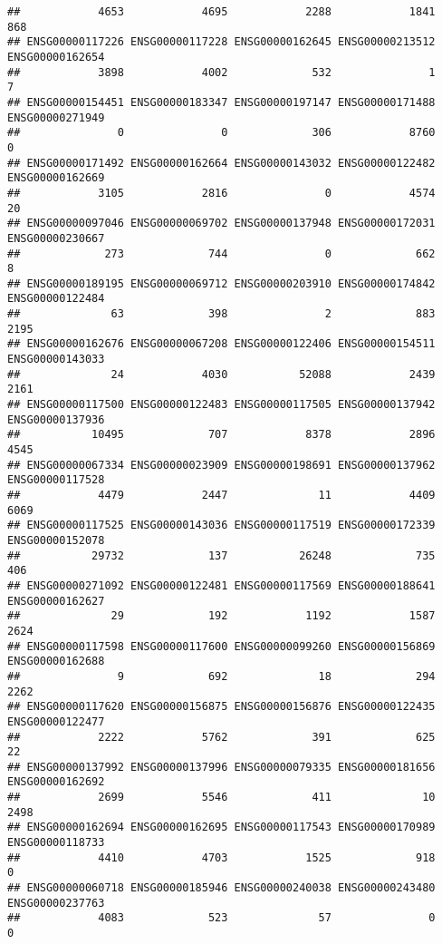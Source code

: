\documentclass[
]{article}
\begin{document}
\begin{verbatim}
##            4653            4695            2288            1841             868 
## ENSG00000117226 ENSG00000117228 ENSG00000162645 ENSG00000213512 ENSG00000162654 
##            3898            4002             532               1               7 
## ENSG00000154451 ENSG00000183347 ENSG00000197147 ENSG00000171488 ENSG00000271949 
##               0               0             306            8760               0 
## ENSG00000171492 ENSG00000162664 ENSG00000143032 ENSG00000122482 ENSG00000162669 
##            3105            2816               0            4574              20 
## ENSG00000097046 ENSG00000069702 ENSG00000137948 ENSG00000172031 ENSG00000230667 
##             273             744               0             662               8 
## ENSG00000189195 ENSG00000069712 ENSG00000203910 ENSG00000174842 ENSG00000122484 
##              63             398               2             883            2195 
## ENSG00000162676 ENSG00000067208 ENSG00000122406 ENSG00000154511 ENSG00000143033 
##              24            4030           52088            2439            2161 
## ENSG00000117500 ENSG00000122483 ENSG00000117505 ENSG00000137942 ENSG00000137936 
##           10495             707            8378            2896            4545 
## ENSG00000067334 ENSG00000023909 ENSG00000198691 ENSG00000137962 ENSG00000117528 
##            4479            2447              11            4409            6069 
## ENSG00000117525 ENSG00000143036 ENSG00000117519 ENSG00000172339 ENSG00000152078 
##           29732             137           26248             735             406 
## ENSG00000271092 ENSG00000122481 ENSG00000117569 ENSG00000188641 ENSG00000162627 
##              29             192            1192            1587            2624 
## ENSG00000117598 ENSG00000117600 ENSG00000099260 ENSG00000156869 ENSG00000162688 
##               9             692              18             294            2262 
## ENSG00000117620 ENSG00000156875 ENSG00000156876 ENSG00000122435 ENSG00000122477 
##            2222            5762             391             625              22 
## ENSG00000137992 ENSG00000137996 ENSG00000079335 ENSG00000181656 ENSG00000162692 
##            2699            5546             411              10            2498 
## ENSG00000162694 ENSG00000162695 ENSG00000117543 ENSG00000170989 ENSG00000118733 
##            4410            4703            1525             918               0 
## ENSG00000060718 ENSG00000185946 ENSG00000240038 ENSG00000243480 ENSG00000237763 
##            4083             523              57               0               0 

\end{verbatim}
\end{document}
